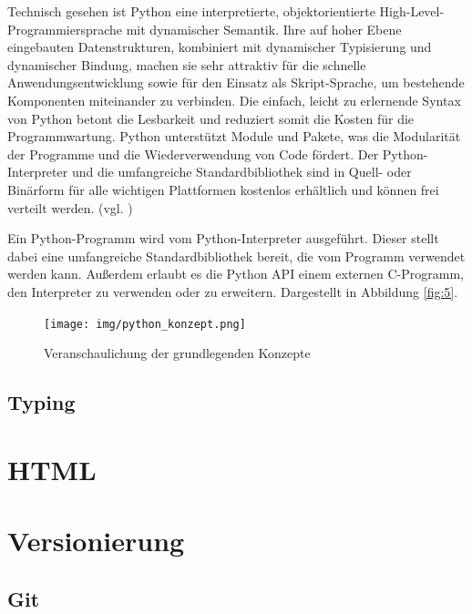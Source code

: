 \documentclass[oneside]{ausarbeitung}
\begin{document}
Technisch gesehen ist Python eine interpretierte, objektorientierte High-Level-Programmiersprache mit dynamischer Semantik. Ihre auf hoher Ebene eingebauten
Datenstrukturen, kombiniert mit dynamischer Typisierung und dynamischer Bindung, machen sie sehr attraktiv für die schnelle Anwendungsentwicklung sowie
für den Einsatz als Skript-Sprache, um bestehende Komponenten miteinander zu
verbinden. Die einfach, leicht zu erlernende Syntax von Python betont die Lesbarkeit und reduziert somit die Kosten für die Programmwartung. Python unterstützt
Module und Pakete, was die Modularität der Programme und die Wiederverwendung
von Code fördert. Der Python-Interpreter und die umfangreiche Standardbibliothek
sind in Quell- oder Binärform für alle wichtigen Plattformen kostenlos erhältlich
und können frei verteilt werden. (vgl. \cite{python_definition})

Ein Python-Programm wird vom Python-Interpreter ausgeführt. Dieser stellt dabei
eine umfangreiche Standardbibliothek bereit, die vom Programm verwendet werden
kann. Außerdem erlaubt es die Python API einem externen C-Programm, den
Interpreter zu verwenden oder zu erweitern. Dargestellt in Abbildung \ref{fig:5}.

\begin{figure}[H]
  \centering
  \texttt{[image: img/python\_konzept.png]}
  \caption{Veranschaulichung der grundlegenden Konzepte\cite{python_konzepte}}
  \label{fig:6}
\end{figure} 

\subsection{Typing}
\label{sub:typing}


\section{HTML}
\label{sec:html}


\section{Versionierung}
\label{sec:versionierung}

\subsection{Git}
\label{sub:git}
\end{document}
